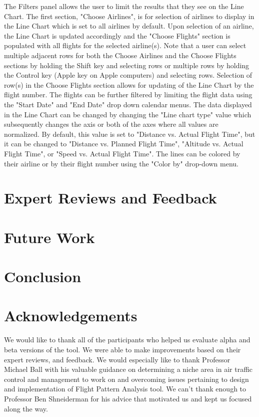 \documentclass{sig-alternate}
\begin{document}
The Filters panel allows the user to limit the results that they see on the Line
Chart. The first section, "Choose Airlines", is for selection of airlines to display 
in the Line Chart which is set to all airlines by default.
Upon selection of an airline, the Line Chart is updated accordingly and the
"Choose Flights" section is populated with all
flights for the selected airline(s). Note that a user can select multiple adjacent
rows for both the Choose Airlines and the Choose Flights sections
by holding the Shift key and selecting rows or 
multiple rows by holding the Control key (Apple key on Apple computers) and selecting rows. 
Selection of row(s) in the Choose Flights section allows for updating of the Line Chart
by the flight number. The flights can be further filtered by limiting the flight data
using the "Start Date" and "End Date" drop down calendar menus. The data displayed 
in the Line Chart can be changed by changing the "Line chart type" value which subsequently
changes the axis or both of the axes where 
all values are normalized. By default, this value is set to "Distance vs. Actual Flight Time",
but it can be changed to "Distance vs. Planned Flight Time", "Altitude vs. Actual Flight Time",
or "Speed vs. Actual Flight Time". The lines can be colored by their airline or by their 
flight number using the "Color by" drop-down menu. 


\section{Expert Reviews and Feedback}
\label{sec-expert-review}

\section{Future Work}
\label{sec-future-work}

\section{Conclusion}
\label{sec-conclusion}

\section{Acknowledgements}
\label{sec-acknowledgements}
We would like to thank all of the
participants who helped us evaluate alpha and
beta versions of the tool. We were able to make
improvements based on their expert reviews,
and feedback. We would especially like to thank
Professor Michael Ball with his valuable guidance
on determining a niche area in air traffic control
and management to work on and overcoming issues
pertaining to design and implementation of Flight
Pattern Analysis tool. We can’t thank enough to
Professor Ben Shneiderman for his advice that
motivated us and kept us focused along the way.


\begin{small}

\end{small}
\end{document}
